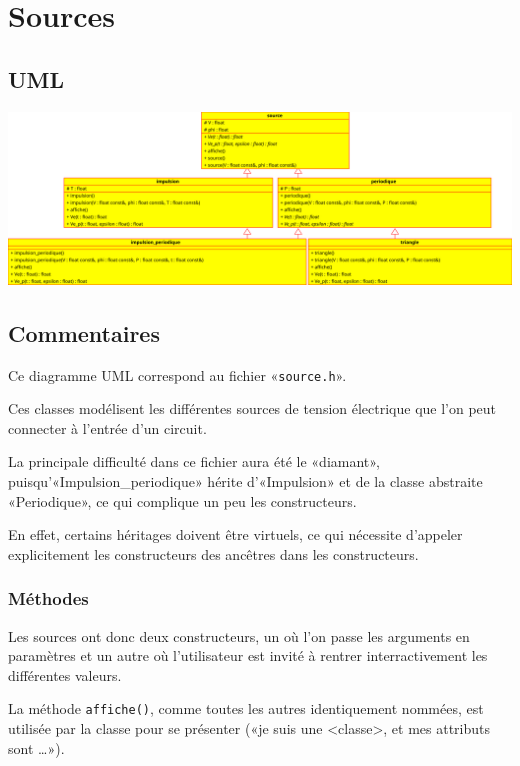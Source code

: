 \documentclass{report}
\begin{document}
\chapter{Sources}
    \begin{multicols}{2}
        \section{UML}
            \includegraphics[width=\linewidth+\linewidth,angle=90]{images/sources_large}

        \section{Commentaires}
            Ce diagramme UML correspond au fichier «\verb|source.h|».

            Ces classes modélisent les différentes sources de tension électrique que l’on peut connecter à l’entrée
            d’un circuit.

            La principale difficulté dans ce fichier aura été le «diamant», puisqu’«Impulsion\_periodique» hérite
            d’«Impulsion» et de la classe abstraite «Periodique», ce qui complique un peu les constructeurs.

            En effet, certains héritages doivent être virtuels, ce qui nécessite d’appeler explicitement les 
            constructeurs des ancêtres dans les constructeurs.

            \subsection{Méthodes}

            Les sources ont donc deux constructeurs, un où l’on passe les arguments en paramètres et un autre où
            l’utilisateur est invité à rentrer interractivement les différentes valeurs.

            La méthode \verb|affiche()|, comme toutes les autres identiquement nommées, est utilisée par la classe
            pour se présenter («je suis une <classe>, et mes attributs sont …»).


\end{multicols}
\end{document}
